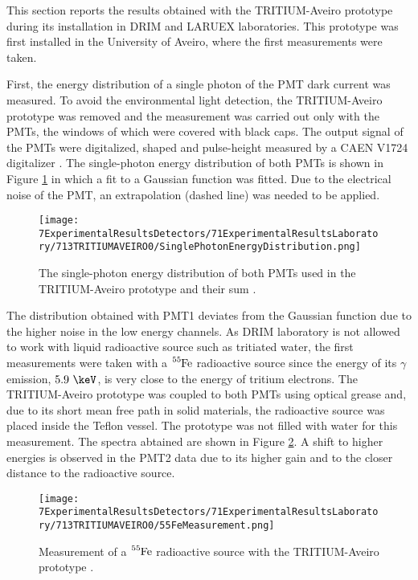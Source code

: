 This section reports the results obtained with the TRITIUM-Aveiro prototype during its installation in DRIM and LARUEX laboratories. This prototype was first installed in the University of Aveiro, where the first measurements were taken. 

First, the energy distribution of a single photon of the PMT dark current was measured. To avoid the environmental light detection, the TRITIUM-Aveiro prototype was removed and the measurement was carried out only with the PMTs, the windows of which were covered with black caps. The output signal of the PMTs were digitalized, shaped and pulse-height measured by a CAEN V1724 digitalizer \cite{CAENV1724}. The single-photon energy distribution of both PMTs is shown in Figure \ref{fig:SinglePhotonEnergyDistribution} in which a fit to a Gaussian function was fitted. Due to the electrical noise of the PMT, an extrapolation (dashed line) was needed to be applied.

\begin{figure}[h]
\centering
\texttt{[image: 7ExperimentalResultsDetectors/71ExperimentalResultsLaboratory/713TRITIUMAVEIRO0/SinglePhotonEnergyDistribution.png]}
\caption{The single-photon energy distribution of both PMTs used in the TRITIUM-Aveiro prototype and their sum \cite{ExperimentalPaperCarlos}.\label{fig:SinglePhotonEnergyDistribution}}
\end{figure}

The distribution obtained with PMT1 deviates from the Gaussian function due to the higher noise in the low energy channels. As DRIM laboratory is not allowed to work with liquid radioactive source such as tritiated water, the first measurements were taken with a $\ce{^{55}Fe}$ radioactive source since the energy of its $\gamma$ emission, $5.9~\keV$, is very close to the energy of tritium electrons. The TRITIUM-Aveiro prototype was coupled to both PMTs using optical grease and, due to its short mean free path in solid materials, the radioactive source was placed inside the Teflon vessel. The prototype was not filled with water for this measurement. The spectra abtained are shown in Figure \ref{fig:55FeMeasurement}. A shift to higher energies is observed in the PMT2 data due to its higher gain and to the closer distance to the radioactive source.

\begin{figure}[h]
\centering
\texttt{[image: 7ExperimentalResultsDetectors/71ExperimentalResultsLaboratory/713TRITIUMAVEIRO0/55FeMeasurement.png]}
\caption{Measurement of a $\ce{^{55}Fe}$ radioactive source with the TRITIUM-Aveiro prototype \cite{ExperimentalPaperCarlos}.\label{fig:55FeMeasurement}}
\end{figure}

